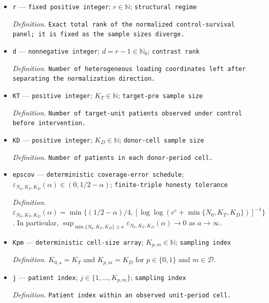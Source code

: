 \documentclass{article}
\begin{document}
\begin{itemize}
  \par\smallskip\noindent\emph{Definition.} \texttt{Generic donor or target unit.}
  \item \texttt{r} --- \texttt{fixed positive integer}; \(r\in\mathbb N\); \texttt{structural regime}
  \par\smallskip\noindent\emph{Definition.} \texttt{Exact total rank of the normalized control-\allowbreak{}survival panel;\allowbreak{} it is fixed as the sample sizes diverge.}
  \item \texttt{d} --- \texttt{nonnegative integer}; \(d=r-1\in\mathbb N_0\); \texttt{contrast rank}
  \par\smallskip\noindent\emph{Definition.} \texttt{Number of heterogeneous loading coordinates left after separating the normalization direction.}
  \item \texttt{KT} --- \texttt{positive integer}; \(K_T\in\mathbb N\); \texttt{target-\allowbreak{}pre sample size}
  \par\smallskip\noindent\emph{Definition.} \texttt{Number of target-\allowbreak{}unit patients observed under control before intervention.}
  \item \texttt{KD} --- \texttt{positive integer}; \(K_D\in\mathbb N\); \texttt{donor-\allowbreak{}cell sample size}
  \par\smallskip\noindent\emph{Definition.} \texttt{Number of patients in each donor-\allowbreak{}period cell.}
  \item \texttt{epscov} --- \texttt{deterministic coverage-\allowbreak{}error schedule}; \(\varepsilon_{N_0,K_T,K_D}(\alpha)\in(0,1/2-\alpha)\); \texttt{finite-\allowbreak{}triple honesty tolerance}
  \par\smallskip\noindent\emph{Definition.} \(\varepsilon_{N_0,K_T,K_D}(\alpha)=\min\{(1/2-\alpha)/4,[\log\log(e^e+\min\{N_0,K_T,K_D\})]^{-1}\}\). In particular, \(\sup_{\min\{N_0,K_T,K_D\}\ge a}\varepsilon_{N_0,K_T,K_D}(\alpha)\to0\) as \(a\to\infty\).
  \item \texttt{Kpm} --- \texttt{deterministic cell-\allowbreak{}size array}; \(K_{p,m}\in\mathbb N\); \texttt{sampling index}
  \par\smallskip\noindent\emph{Definition.} \(K_{0,\star}=K_T\) and \(K_{p,m}=K_D\) for \(p\in\{0,1\}\) and \(m\in\mathcal D\).
  \item \texttt{j} --- \texttt{patient index}; \(j\in\{1,\ldots,K_{p,m}\}\); \texttt{sampling index}
  \par\smallskip\noindent\emph{Definition.} \texttt{Patient index within an observed unit-\allowbreak{}period cell.}

\end{itemize}
\end{document}
